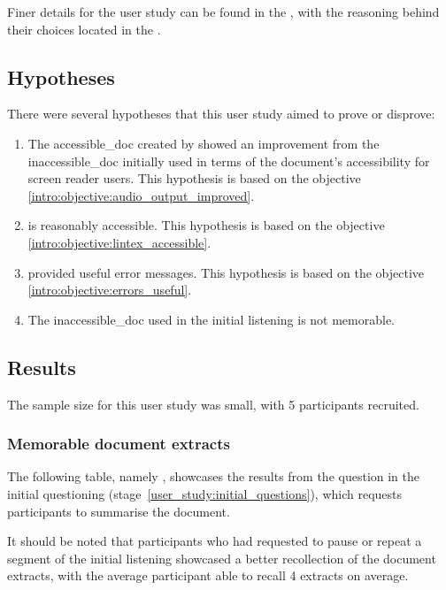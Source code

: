 Finer details for the user study can be found in the , with the reasoning behind their choices located in the .\subsection{Hypotheses}
There were several hypotheses that this user study aimed to prove or disprove:
\begin{enumerate}[label=\textbf{H\arabic*}]
	\item The \gls{accessible_doc} created by \lintexspaced showed an improvement from the \gls{inaccessible_doc} initially used in terms of the document's accessibility for screen reader users. This hypothesis is based on the objective \ref{intro:objective:audio_output_improved}.\label{user_study:hypothesis:improved_doc_accessibility}
	\item \lintexspaced is reasonably accessible. This hypothesis is based on the objective \ref{intro:objective:lintex_accessible}.\label{user_study:hypothesis:lintex_accessible}
	\item \lintexspaced provided useful error messages. This hypothesis is based on the objective \ref{intro:objective:errors_useful}.\label{user_study:hypothesis:errors}
	\item The \gls{inaccessible_doc} used in the initial listening is not memorable.\label{user_study:hypothesis:memorable}
\end{enumerate}
\subsection{Results}
The sample size for this user study was small, with 5 participants recruited.

\subsubsection{Memorable document extracts}

The following table, namely , showcases the results from the question in the initial questioning (stage~\ref{user_study:initial_questions}), which requests participants to summarise the document.



It should be noted that participants who had requested to pause or repeat a segment of the initial listening showcased a better recollection of the document extracts, with the average participant able to recall 4 extracts on average.

